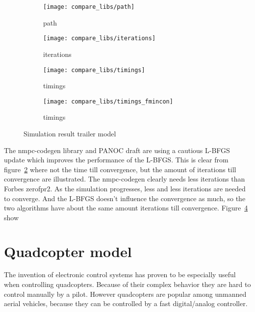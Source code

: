 \begin{figure}[H]
	\centering
	\begin{subfigure}[b]{0.45\textwidth}
		\centering
		\texttt{[image: compare\_libs/path]}
		\caption{path}
		\label{fig:solution path trailer example}
	\end{subfigure}
	\hfill
	\begin{subfigure}[b]{0.45\textwidth}
		\centering
		\texttt{[image: compare\_libs/iterations]}
		\caption{iterations}
		\label{fig:iterations trailer example}
	\end{subfigure}
	
	\begin{subfigure}[b]{0.45\textwidth}
		\centering
		\texttt{[image: compare\_libs/timings]}
		\caption{timings}
		\label{fig:timings trailer example}
	\end{subfigure}
	\hfill
	\begin{subfigure}[b]{0.45\textwidth}
		\centering
		\texttt{[image: compare\_libs/timings\_fmincon]}
		\caption{timings}
		\label{fig:timings fmincon Matlab trailer example}
	\end{subfigure}
	\caption{Simulation result trailer model}
	\label{fig:simulation result trailer model}
\end{figure}

The nmpc-codegen library and PANOC draft are using a cautious L-BFGS update which improves the performance of the L-BFGS. This is clear from figure~\ref{fig:iterations trailer example} where not the time till convergence, but the amount of iterations till convergence are illustrated. The nmpc-codegen clearly needs less iterations than  Forbes zerofpr2. As the simulation progresses, less and less iterations are needed to converge. And the L-BFGS doesn't influence the convergence as much, so the two algorithms have about the same amount iterations till convergence. Figure~\ref{fig:timings fmincon Matlab trailer example} show


\section{Quadcopter model}
The invention of electronic control systems has proven to be especially useful when controlling quadcopters. Because of their complex behavior they are hard to control manually by a pilot. However quadcopters are popular among unmanned aerial vehicles, because they can be controlled by a fast digital/analog controller.

